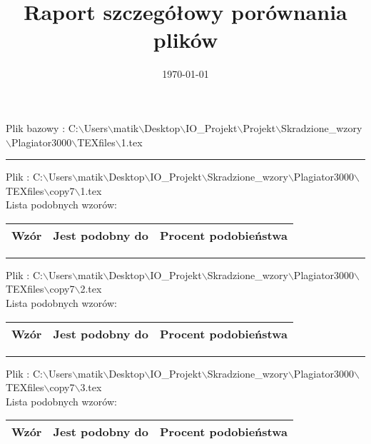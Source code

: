 \documentclass{article}
\begin{document}
\title{\huge\bfseries Raport szczegółowy porównania plików }
\date{\today}
\maketitle
\begin{flushleft}
Plik bazowy : C:$\backslash$Users$\backslash$matik$\backslash$Desktop$\backslash$IO\_Projekt$\backslash$Projekt$\backslash$Skradzione\_wzory$\backslash$Plagiator3000$\backslash$TEXfiles$\backslash$1.tex
\end{flushleft}
\hrule
\begin{flushleft}
Plik : C:$\backslash$Users$\backslash$matik$\backslash$Desktop$\backslash$IO\_Projekt$\backslash$Skradzione\_wzory$\backslash$Plagiator3000$\backslash$TEXfiles$\backslash$copy7$\backslash$1.tex\\ 
Lista podobnych wzorów: \\ 
\begin{longtable}{|c|c|c|} 
 \hline 
 Wzór & Jest podobny do & Procent podobieństwa \\ \hline  
\end{longtable} 

\end{flushleft}
\hrule
\begin{flushleft}
Plik : C:$\backslash$Users$\backslash$matik$\backslash$Desktop$\backslash$IO\_Projekt$\backslash$Skradzione\_wzory$\backslash$Plagiator3000$\backslash$TEXfiles$\backslash$copy7$\backslash$2.tex\\ 
Lista podobnych wzorów: \\ 
\begin{longtable}{|c|c|c|} 
 \hline 
 Wzór & Jest podobny do & Procent podobieństwa \\ \hline  
\end{longtable} 

\end{flushleft}
\hrule
\begin{flushleft}
Plik : C:$\backslash$Users$\backslash$matik$\backslash$Desktop$\backslash$IO\_Projekt$\backslash$Skradzione\_wzory$\backslash$Plagiator3000$\backslash$TEXfiles$\backslash$copy7$\backslash$3.tex\\ 
Lista podobnych wzorów: \\ 
\begin{longtable}{|c|c|c|} 
 \hline 
 Wzór & Jest podobny do & Procent podobieństwa \\ \hline  
\end{longtable} 

\end{flushleft}
\end{document}
